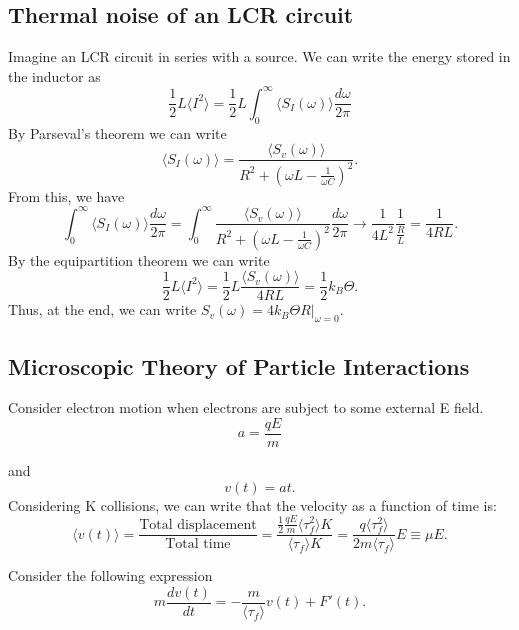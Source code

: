 \documentclass{article}
\begin{document}
\subsection{Thermal noise of an LCR circuit}
Imagine an LCR circuit in series with a source. We can write the energy stored
in the inductor as
\[
   \frac{1}{2} L \langle I^{2} \rangle = \frac{1}{2} L \int_{0}^{\infty} \langle
   S_{I}(\omega) \rangle \frac{d\omega}{2 \pi}
\]
By Parseval's theorem we can write
\[
   \langle S_{I}(\omega) \rangle =\frac{ \langle S_{v}(\omega) \rangle}{R^2 +
   \left( \omega L - \frac{1}{\omega C} \right)^{2}}.
\]
From this, we have
\[
   \int_{0}^{\infty} \langle S_{I}(\omega) \rangle \frac{d\omega}{2 \pi} =
   \int_{0}^{\infty} \frac{\langle S_{v}(\omega) \rangle}{R^{2} + \left( \omega
   L - \frac{1}{\omega C}\right)^{2}} \frac{d\omega}{2 \pi} \rightarrow
   \frac{1}{4 L^{2}} \frac{1}{\frac{R}{L}} = \frac{1}{4 R L }.
\]
By the equipartition theorem we can write
\[
 \frac{1}{2}L \langle I^{2} \rangle =
\frac{1}{2} L \frac{\langle S_{v}(\omega) \rangle}{4 R L} =
\frac{1}{2}k_{B}\Theta.
\]
Thus, at the end, we can write $ S_{v}(\omega) = 4 k_{B}\Theta R\big|_{\omega=0}
$.

\subsection{Microscopic Theory of Particle Interactions}
Consider electron motion when electrons are subject to some external E field.
\[
   a = \frac{q E}{m}
\]

and
\[
   v(t) = a t.
\]
Considering K collisions, we can write that the velocity as a function of time
is:
\[
   \langle v(t) \rangle = \frac{\text{Total displacement}}{\text{Total time}} =
   \frac{\frac{1}{2} \frac{q E}{m} \langle \tau_{f}^{2} \rangle K}{\langle
   \tau_{f} \rangle K} = \frac{q \langle \tau_{f}^{2}\rangle}{2 m \langle
\tau_{f} \rangle} E \equiv \mu E .
\]

Consider the following expression
\[
   m \frac{dv(t)}{dt} = -\frac{m}{\langle \tau_{f}\rangle} v(t) + F'(t).
\]
\end{document}
